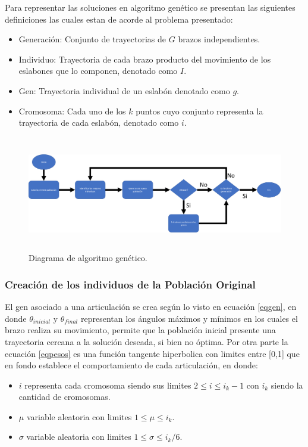 \documentclass[12pt]{article}
\begin{document}
Para representar las soluciones en algoritmo genético se presentan las siguientes definiciones las cuales estan de acorde al problema presentado:
\begin{itemize}
    \item Generación: Conjunto de trayectorias de $G$ brazos independientes.
    \item Individuo: Trayectoria de cada brazo producto del movimiento de los eslabones que lo componen, denotado como $I$.
    \item Gen: Trayectoria individual de un eslabón denotado como $g$.
    \item Cromosoma: Cada uno de los $k$ puntos cuyo conjunto representa la trayectoria de cada eslabón, denotado como $i$.
\end{itemize}

\begin{figure}
\centering
\includegraphics[width=13cm,height=5cm]{imag/Algortimo_Genetico_diagrama.png}
\caption{Diagrama de algoritmo genético.}
\label{genetico}
\end{figure}




\subsubsection{Creación de los individuos de la Población Original}

El gen asociado a una articulación se crea según lo visto en ecuación \eqref{eqgen}, en donde $\theta _{inicial}$ y $\theta _{final}$ representan los ángulos máximos y mínimos en los cuales el brazo realiza su movimiento, permite que la población inicial presente una trayectoria cercana a la solución deseada, si bien no óptima. Por otra parte la ecuación \eqref{eqpesos} es una función tangente hiperbolica con limites entre [0,1] que en fondo establece el comportamiento de cada articulación, en donde:

\begin{itemize}
\item $i$ representa cada cromosoma siendo sus limites $ 2\leq i \leq i_{k}-1$ con $i_{k}$ siendo la cantidad de cromosomas.
\item $\mu$ variable aleatoria con limites $1\leq \mu  \leq i_{k}$.
\item $\sigma$ variable aleatoria con limites $1\leq \sigma\leq i_{k}/6$.
\end{itemize}
\end{document}
